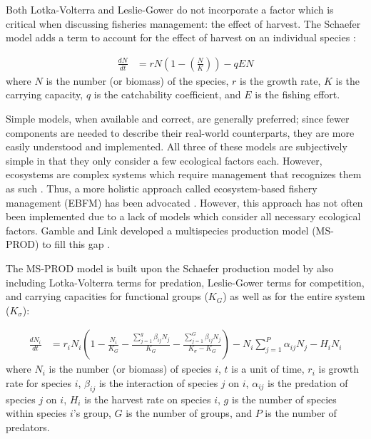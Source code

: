 Both Lotka-Volterra and Leslie-Gower do not incorporate a factor which is critical when discussing fisheries management: the effect of harvest.  The Schaefer model adds a term to account for the effect of harvest on an individual species \cite{schaefer1957}:

\begin{align}
   \frac{d N}{dt} &= r N \left(1 - \left(\frac{N}{K}\right)\right) - q E N
\end{align}
where $N$ is the number (or biomass) of the species, $r$ is the growth rate, $K$ is the carrying capacity, $q$ is the catchability coefficient, and $E$ is the fishing effort.

Simple models, when available and correct, are generally preferred; since fewer components are needed to describe their real-world counterparts, they are more easily understood and implemented.  All three of these models are subjectively simple in that they only consider a few ecological factors each. However, ecosystems are complex systems which require management that recognizes them as such \cite{christensen1996}.  Thus, a more holistic approach called ecosystem-based fishery management (EBFM) has been advocated \cite{united1999}.  However, this approach has not often been implemented due to a lack of models which consider all necessary ecological factors.  Gamble and Link developed a multispecies production model (MS-PROD) to fill this gap \cite{gamble2009}.

The MS-PROD model is built upon the Schaefer production model by also including Lotka-Volterra terms for predation, Leslie-Gower terms for competition, and carrying capacities for functional groups ($K_G$) as well as for the entire system ($K_{\sigma}$):

\begin{align}
\frac{d N_i}{dt} &= r_i N_i \left(1 - \frac{N_i}{K_G} - \frac{\displaystyle\sum\limits_{j=1}^g \beta_{ij} N_j}{K_G} - \frac{\displaystyle\sum\limits_{j=1}^G \beta_{ij} N_j}{K_{\sigma} - K_G}\right) - N_i \displaystyle\sum\limits_{j=1}^P \alpha_{ij} N_j - H_i N_i
\end{align}
where $N_i$ is the number (or biomass) of species $i$, $t$ is a unit of time, $r_i$ is growth rate for species $i$, $\beta_{ij}$ is the interaction of species $j$ on $i$, $\alpha_{ij}$ is the predation of species $j$ on $i$, $H_i$ is the harvest rate on species $i$, $g$ is the number of species within species $i$'s group, $G$ is the number of groups, and $P$ is the number of predators.

